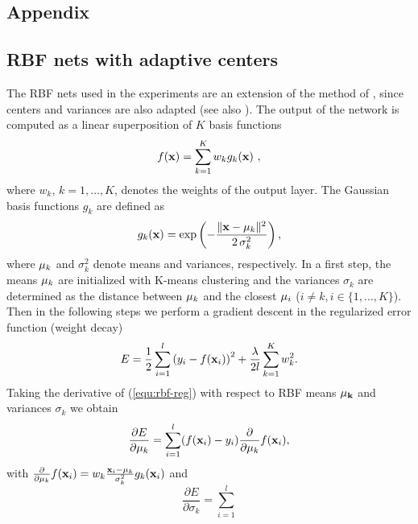 \documentclass{article}
\begin{document}
\begin{appendix}
\section{Appendix}
\subsection{RBF nets with adaptive centers}
\label{app:rbf}

The RBF nets used in the experiments are an extension of the method of
\cite{MooDar89}, since centers and variances are also adapted (see also
\cite{Bis95,MueSmoRaeSchKohVap98}). The output of the network is
computed as a linear superposition of $K$ basis functions
\begin{equation}
  f({\bf x})=\sum_{k=1}^K w_k g_k({\bf x})~,
\end{equation}
where $w_k$, $k=1, \dots, K$, denotes the weights of the output layer.
The Gaussian basis functions $g_k$ are defined as
\begin{equation}
  g_k({\bf x})= \exp\left(-\frac{\|{\bf x}-{\bf \mu}_k\|^2}{2\,\sigma_k^2}\right),
\end{equation}
where ${\bf \mu}_k$ and $\sigma_k^2$ denote means and variances,
respectively. In a first step, the means ${\bf \mu}_k$ are initialized
with K-means clustering and the variances $\sigma_k$ are determined as
the distance between ${\bf \mu}_k$ and the closest ${\bf \mu}_i$
($i\ne k, i\in \{1,\ldots,K\}$). Then in the following steps we
perform a gradient descent in the regularized error function (weight
decay)
\begin{equation}
  E = \frac{1}{2}\sum_{i=1}^l \left(y_i - f({\bf x}_i)\right)^2 +
  \frac{\lambda}{2 l} \sum_{k=1}^K w_k^2.
\label{equ:rbf-reg} 
\end{equation}
%
%
Taking the derivative of (\ref{equ:rbf-reg}) with respect to
RBF means $\bf\mu_k$ and variances $\sigma_k$ we obtain
\begin{equation}
  \frac{\partial E}{\partial {\bf \mu}_k} =
    \sum_{i=1}^l (f({\bf x}_i)- y_i)\frac{\partial}{\partial {\bf \mu}_k}f({\bf x}_i), 
  \label{equ:grad_C_mu}
\end{equation}
with $\frac{\partial}{\partial {\bf \mu}_k} f({\bf x}_i) = w_k\frac{{\bf x}_i-{\bf
    \mu}_k}{\sigma_k^2} g_k({\bf x}_i)$ and
\begin{equation}
  \frac{\partial E}{\partial \sigma_k} = \sum_{i=1}^l

\end{equation}
\end{appendix}
\end{document}
